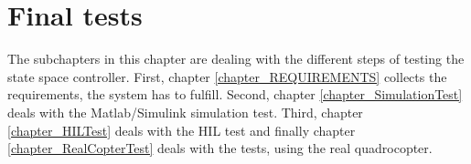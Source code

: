 \section{Final tests}\label{chapter_TEST}

The subchapters in this chapter are dealing with the different steps of testing the state space controller. First, chapter \ref{chapter_REQUIREMENTS} collects the requirements, the system has to fulfill. Second, chapter \ref{chapter_SimulationTest} deals with the Matlab/Simulink simulation test. Third, chapter \ref{chapter_HILTest} deals with the HIL test and finally chapter \ref{chapter_RealCopterTest} deals with the tests, using the real quadrocopter.

\pagestyle{fancy}


\pagestyle{fancy}


\pagestyle{fancy}


\pagestyle{fancy}
